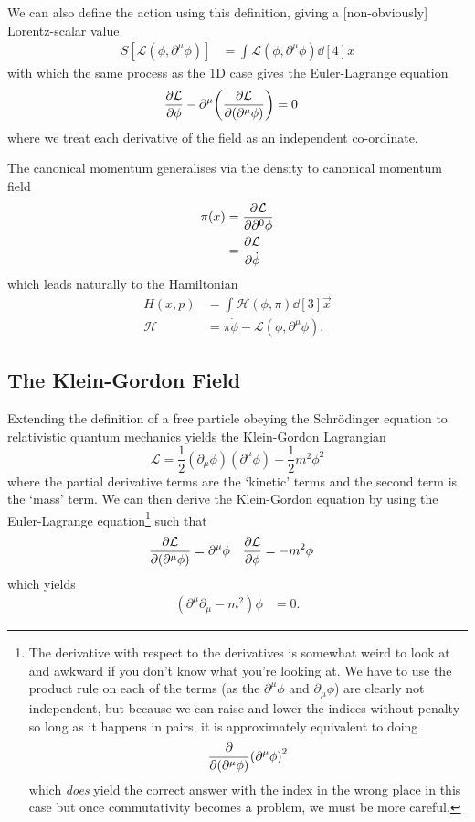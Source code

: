 \documentclass[notes.tex]{subfiles}
\begin{document}
We can also define the action using this definition, giving a [non-obviously] Lorentz-scalar value
\begin{align}
  S[\mathcal{L}(\phi, \partial^\mu\phi)] &= \int \mathcal{L}(\phi, \partial^\mu\phi) \dd[4]{x}\label{eqn:rqft_cft_action_4}
\end{align}
with which the same process as the 1D case gives the Euler-Lagrange equation
\begin{align*}
  \pdv{\mathcal{L}}{\phi} - \partial^\mu\qty(\pdv{\mathcal{L}}{(\partial^\mu \phi)}) &= 0
\end{align*}
where we treat each derivative of the field as an independent co-ordinate. 

The canonical momentum generalises via the density to canonical momentum field
\begin{align*}
  \pi(x) &= \pdv{\mathcal{L}}{\partial^0 \phi}\\
  &= \pdv{\mathcal{L}}{\dot\phi}
\end{align*}
which leads naturally to the Hamiltonian
\begin{align*}
  H(x, p) &= \int\mathcal{H}(\phi, \pi) \dd[3]{\vec{x}}\\
  \mathcal{H} &= \pi\dot\phi - \mathcal{L}(\phi, \partial^\mu \phi).
\end{align*}

  \subsection{The Klein-Gordon Field} Extending the definition of a free particle obeying the Schr\"odinger equation to relativistic quantum mechanics yields the Klein-Gordon Lagrangian
  \begin{equation*}
    \mathcal{L} = \frac{1}{2} (\partial_\mu \phi) (\partial^\mu \phi) - \frac{1}{2} m^2 \phi^2
  \end{equation*} 
  where the partial derivative terms are the `kinetic' terms and the second term is the `mass' term.
  We can then derive the Klein-Gordon equation by using the Euler-Lagrange equation\footnote{The derivative with respect to the derivatives is somewhat weird to look at and awkward if you don't know what you're looking at. We have to use the product rule on each of the terms (as the $\partial^\mu \phi$ and $\partial_\mu \phi$) are clearly not independent, but because we can raise and lower the indices without penalty so long as it happens in pairs, it is approximately equivalent to doing $$\pdv{(\partial^\mu\phi)} (\partial^\mu \phi)^2$$ which \emph{does} yield the correct answer with the index in the wrong place in this case but once commutativity becomes a problem, we must be more careful.} such that
  \begin{align*}
    \pdv{\mathcal{L}}{(\partial^\mu \phi)} &= \partial^\mu \phi & \pdv{\mathcal{L}}{\phi} &= -m^2 \phi
  \end{align*}
  which yields
  \begin{align}
    (\partial^\mu\partial_\mu - m^2) \phi &= 0.
  \end{align}
\end{document}
